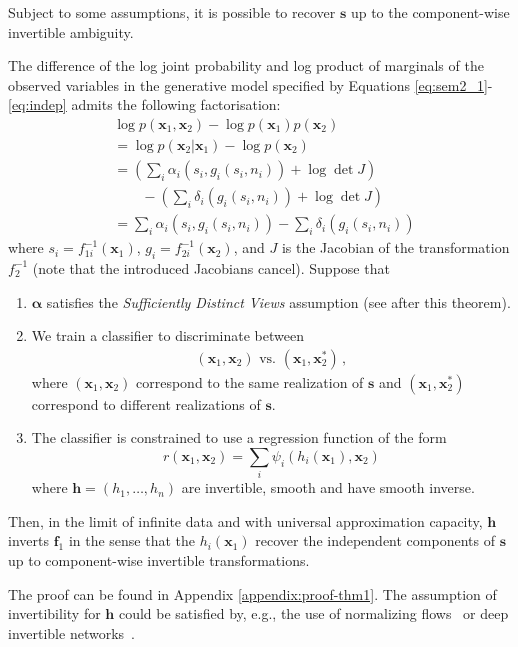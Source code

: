 \documentclass[letterpaper]{article}
\theoremstyle{definition}
\begin{document}
Subject to some assumptions, it is possible to recover $\bm{s}$ up to the
component-wise invertible ambiguity.

\begin{theorem}
\label{thm:noiseless1}
The difference of the log joint probability and log product of marginals of the observed variables in the generative model specified by Equations \ref{eq:sem2_1}-\ref{eq:indep} admits the following factorisation:
\begin{align}
&\log p(\bm{x}_1, \bm{x}_2) - \log p(\bm{x}_1) p(\bm{x}_2) \nonumber \\
&= \log p(\bm{x}_2 | \bm{x}_1) - \log p(\bm{x}_2) \nonumber\\
&= \left(\sum_i \alpha_i(s_{i}, g_i(s_i, n_i)) + \log \det J \right) \nonumber\\
&\qquad - \left( \sum_i \delta_i(g_i(s_i, n_i)) + \log \det J\right) \nonumber\\
&= \sum_i \alpha_i(s_{i}, g_i(s_i, n_i)) - \sum_i \delta_i(g_i(s_i, n_i))\label{eq:logdens_noiesless_1} \,
\end{align}
where $s_i=f^{-1}_{1i}(\bm{x}_1)$, $g_i=f^{-1}_{2i}(\bm{x}_2)$,
and $J$ is the Jacobian of the transformation $f^{-1}_2$ (note that the introduced Jacobians cancel).
Suppose that
\begin{enumerate}
    \item $\bm{\alpha}$ satisfies the \emph{Sufficiently Distinct Views} assumption (see after this theorem).
    \item We train a classifier to discriminate between
\begin{align*}
(\bm{x}_{1},\bm{x}_{2}) \text{ vs. } (\bm{x}_{1},\bm{x}_{2}^{*})\,,
\end{align*}
where $(\bm{x}_{1},\bm{x}_{2})$ correspond to the same realization of $\bm{s}$ and $(\bm{x}_{1},\bm{x}_{2}^{*})$ correspond to different realizations of $\bm{s}$.
\item The classifier is constrained to use a regression function of the form
\begin{equation*}
r(\bm{x}_{1},\bm{x}_{2})=\sum_{i}\psi_{i}(h_{i}(\bm{x}_{1}),\bm{x}_{2})
\end{equation*}
where $\bm{h} =(h_{1}, \ldots, h_{n})$  are invertible, smooth and have smooth inverse.
\end{enumerate}

Then, in the limit of infinite data and with universal approximation capacity, $\bm{h}$ inverts $\bm{f}_1$ in the sense that the $h_{i}(\bm{x}_1)$ recover the independent  components of $\bm{s}$ up to component-wise invertible transformations.
\end{theorem}
The proof can be found in Appendix \ref{appendix:proof-thm1}.
The assumption of invertibility for $\bm{h}$ could be satisfied by, e.g., the use of normalizing flows~\cite{rezende2015variational, chen2018neural} or deep invertible networks~\cite{jacobsen_hal-01712808}.
\end{document}

